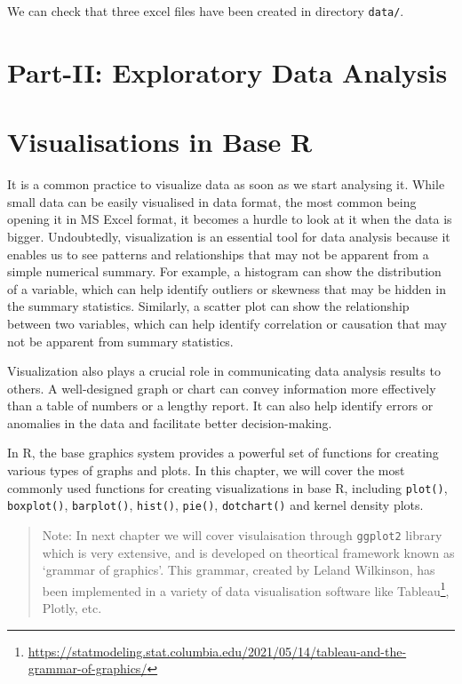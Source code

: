 \documentclass[
]{book}
\begin{document}
We can check that three excel files have been created in directory \texttt{data/}.

\hypertarget{part-ii-exploratory-data-analysis}{%
\chapter*{Part-II: Exploratory Data Analysis}\label{part-ii-exploratory-data-analysis}}

\hypertarget{visualisations-in-base-r}{%
\chapter{Visualisations in Base R}\label{visualisations-in-base-r}}

It is a common practice to visualize data as soon as we start analysing it. While small data can be easily visualised in data format, the most common being opening it in MS Excel format, it becomes a hurdle to look at it when the data is bigger. Undoubtedly, visualization is an essential tool for data analysis because it enables us to see patterns and relationships that may not be apparent from a simple numerical summary. For example, a histogram can show the distribution of a variable, which can help identify outliers or skewness that may be hidden in the summary statistics. Similarly, a scatter plot can show the relationship between two variables, which can help identify correlation or causation that may not be apparent from summary statistics.

Visualization also plays a crucial role in communicating data analysis results to others. A well-designed graph or chart can convey information more effectively than a table of numbers or a lengthy report. It can also help identify errors or anomalies in the data and facilitate better decision-making.

In R, the base graphics system provides a powerful set of functions for creating various types of graphs and plots. In this chapter, we will cover the most commonly used functions for creating visualizations in base R, including \texttt{plot()}, \texttt{boxplot()}, \texttt{barplot()}, \texttt{hist()}, \texttt{pie()}, \texttt{dotchart()} and kernel density plots.

\begin{quote}
Note: In next chapter we will cover visulaisation through \texttt{ggplot2} library which is very extensive, and is developed on theortical framework known as `grammar of graphics'. This grammar, created by Leland Wilkinson, has been implemented in a variety of data visualisation software like Tableau\footnote{\url{https://statmodeling.stat.columbia.edu/2021/05/14/tableau-and-the-grammar-of-graphics/}}, Plotly, etc.
\end{quote}
\end{document}

